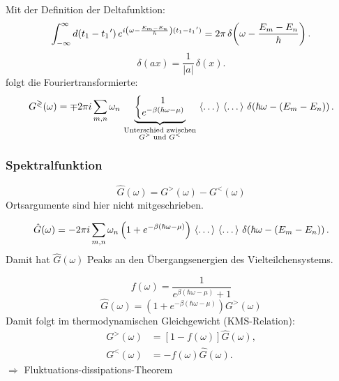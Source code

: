 Mit der Definition der Deltafunktion:
\begin{equation*}
  \int_{-\infty}^{\infty} d(t_1-t_1\mkern1mu')\,
  e^{i\left(\omega-\frac{E_m-E_n}{\hbar}\right)(t_1-t_1\mkern1mu')}
  =2\pi\,\delta\!\left(\omega-\frac{E_m-E_n}{\hbar}\right).
\end{equation*}
\begin{equation*}
  \delta(ax)=\frac{1}{|a|}\,\delta(x).
\end{equation*}
folgt die Fouriertransformierte:
\begin{equation}
  G^{\gtrless}(\omega)=\mp 2\pi i\sum_{m,n}\omega_n\,
  \underbrace{\left\{\begin{matrix}
      1 \\
      e^{-\beta(\hbar\omega-\mu)}
    \end{matrix}\right.}_{\substack{\text{Unterschied zwischen}\\ G^{>}\text{ und }G^{<}}}\,
  \left\langle\dots\right\rangle\,\left\langle\dots\right\rangle\,
  \delta\!\left(\hbar\omega-(E_m-E_n)\right).
\end{equation}

\subsubsection*{Spektralfunktion}

\begin{equation}
  \hat G(\omega)=G^{>}(\omega)-G^{<}(\omega)
\end{equation}
Ortsargumente sind hier nicht mitgeschrieben.

\begin{equation}
  \hat G(\omega)
  =-2\pi i\sum_{m,n}\omega_n\left(1+e^{-\beta(\hbar\omega-\mu)}\right)
  \,\left\langle\dots\right\rangle\,\left\langle\dots\right\rangle\,
  \delta\!\left(\hbar\omega-(E_m-E_n)\right).
\end{equation}
Damit hat $\hat G(\omega)$ Peaks an den Übergangsenergien des Vielteilchensystems.

\begin{equation}
  f(\omega)=\frac{1}{e^{\beta(\hbar\omega-\mu)}+1}
\end{equation}
\begin{equation}
  \hat G(\omega)=\left(1+e^{-\beta(\hbar\omega-\mu)}\right)G^{>}(\omega)
\end{equation}
Damit folgt im thermodynamischen Gleichgewicht (KMS-Relation):
\begin{align}
  G^{>}(\omega) & = \left[1-f(\omega)\right]\hat G(\omega), \\
  G^{<}(\omega) & = -f(\omega)\hat G(\omega).
\end{align}
$\Rightarrow$ Fluktuations-dissipations-Theorem

